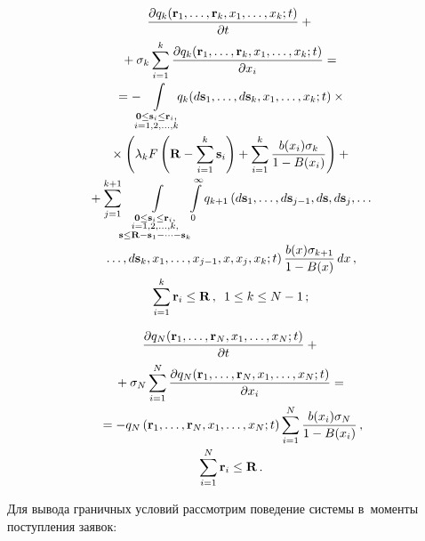 \begin{multicols}{2}
\noindent
  \begin{multline}
  \fr{\partial q_k(\mathbf{r}_1,\ldots, \mathbf{r}_k, x_1, \ldots, x_k;t)}{\partial 
t} +{}\\[-1pt]
{}+\sigma_k\sum\limits^k_{i=1}\fr{\partial q_k(\mathbf{r}_1,\ldots, 
\mathbf{r}_k, x_1, \ldots, x_k;t)}{\partial x_i}={}\\[-1pt]
  {}= - \!\!\!\int\limits_{\substack{{\mathbf{0}\leq 
  \mathbf{s}_i\leq \mathbf{r}_i,}\\  {i=1,2,\ldots,k}}} 
\!\!\!q_k(d\mathbf{s}_1,\ldots, d\mathbf{s}_k, x_1,\ldots, x_k;t)\times{}\\[-1pt]
{}\times\left( \lambda_k F\left( \mathbf{R}-
\sum\limits^k_{i=1} \mathbf{s}_i\right) +\sum\limits^k_{i=1} \fr{b(x_i) \sigma_k}{1-
B(x_i)}\right)+{}\\[-1pt]
  {}+\sum\limits_{j=1}^{k+1}\!
  \int\limits_{\substack{{\mathbf{0}\leq \mathbf{s}_i\leq \mathbf{r}_i,}\\[-1pt]  
  {i=1,2,\ldots,k,}\\ {\mathbf{s}\leq 
\mathbf{R}-\mathbf{s}_1-\cdots -\mathbf{s}_k}}} \!\!\!\int\limits_0^\infty q_{k+1}
  \left( d\mathbf{s}_1, \ldots, d\mathbf{s}_{j-1}, d\mathbf{s}, d\mathbf{s}_j,\ldots\right.\\[-1pt]
 \left. \ldots, d\mathbf{s}_k, x_1,\ldots, x_{j-1}, x, x_j, 
x_k;t\right) \fr{b(x)\sigma_{k+1}}{1-B(x)}\,dx\,,\\[-1pt]
  \sum\limits^k_{i=1} \mathbf{r}_i\leq \mathbf{R}\,,\enskip 1\leq k\leq N-1\,;
  \label{e11-sop}
  \end{multline}

\vspace*{-12pt}

\noindent
\begin{multline}
\displaystyle\frac{\displaystyle \partial q_N (\mathbf{r}_1,\ldots, \mathbf{r}_N, x_1, \ldots, x_N;t)\mathstrut}{\displaystyle \partial 
t\mathstrut} +{}\\[-1pt]
{}+\sigma_N \sum\limits^N_{i=1} \displaystyle\frac{\displaystyle \partial q_N(\mathbf{r}_1, \ldots, 
\mathbf{r}_N, x_1, \ldots, x_N;t)\mathstrut}{\displaystyle \partial x_i\mathstrut} ={}\\[-1pt]
{}=
-q_N\left( \mathbf{r}_1,\ldots, \mathbf{r}_N, x_1,\ldots, x_N;t\right) 
\sum\limits^N_{i=1} \displaystyle\frac{\displaystyle b(x_i)\sigma_N\mathstrut}{\displaystyle 1-B(x_i)\mathstrut}\,,\\[-1pt] 
\sum\limits^N_{i=1} 
\mathbf{r}_i\leq \mathbf{R}\,.
\label{e12-sop}
\end{multline}
  
  Для вывода граничных условий рассмотрим поведение системы в~моменты 
поступления заявок:


\end{multicols}
